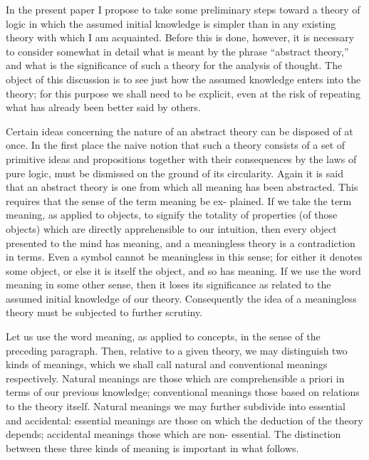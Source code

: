 \documentclass[10pt, twoside]{extarticle}
\theoremstyle{breaktheorem}
\theoremstyle{mylemma}
\theoremstyle{mydefinition}
\theoremstyle{mycorollary}
\begin{document}
In the present paper I propose to take some preliminary steps toward a
theory of logic in which the assumed initial knowledge is simpler than in
any existing theory with which I am acquainted. Before this is done, however,
it is necessary to consider somewhat in detail what is meant by the phrase
``abstract theory,'' and what is the significance of such a theory for the
analysis of thought. The object of this discussion is to see just how the
assumed knowledge enters into the theory; for this purpose we shall need to
be explicit, even at the risk of repeating what has already been better said
by others.

Certain ideas concerning the nature of an abstract theory can be disposed
of at once. In the first place the naive notion that such a theory consists of
a set of primitive ideas and propositions together with their consequences
by the laws of pure logic, must be dismissed on the ground of its circularity.
Again it is said that an abstract theory is one from which all meaning has
been abstracted. This requires that the sense of the term meaning be ex-
plained. If we take the term meaning, as applied to objects, to signify the
totality of properties (of those objects) which are directly apprehensible to
our intuition, then every object presented to the mind has meaning, and a
meaningless theory is a contradiction in terms. Even a symbol cannot be
meaningless in this sense; for either it denotes some object, or else it is
itself the object, and so has meaning. If we use the word meaning in some
other sense, then it loses its significance as related to the assumed initial
knowledge of our theory. Consequently the idea of a meaningless theory
must be subjected to further scrutiny.

Let us use the word meaning, as applied to concepts, in the sense of the
preceding paragraph. Then, relative to a given theory, we may distinguish
two kinds of meanings, which we shall call natural and conventional meanings
respectively. Natural meanings are those which are comprehensible a priori
in terms of our previous knowledge; conventional meanings those based on
relations to the theory itself. Natural meanings we may further subdivide
into essential and accidental: essential meanings are those on which the
deduction of the theory depends; accidental meanings those which are non-
essential. The distinction between these three kinds of meaning is important
in what follows.
\end{document}
